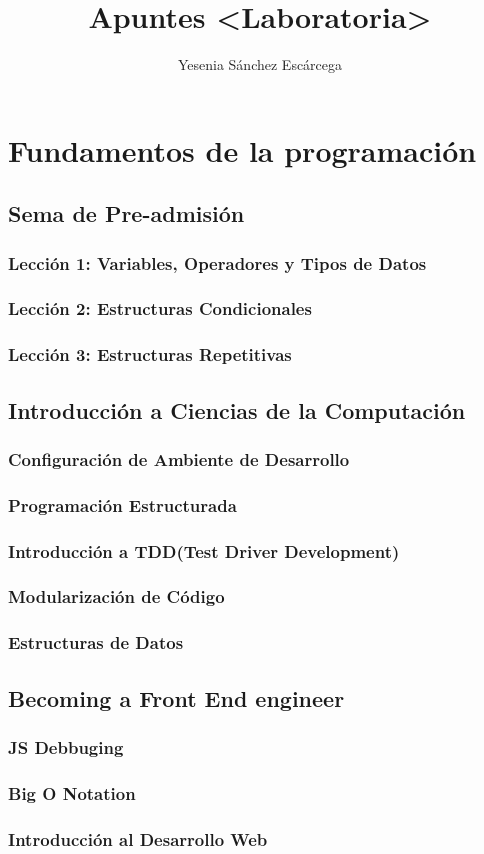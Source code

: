 \documentclass{book}
\title{Apuntes <Laboratoria>}
\author{Yesenia Sánchez Escárcega}
\begin{document}

\maketitle

\part{Fundamentos de la programación}

\chapter{Sema de Pre-admisión}

\section{Lección 1: Variables, Operadores y Tipos de Datos}
\section{Lección 2: Estructuras Condicionales}
\section{Lección 3: Estructuras Repetitivas}

\chapter{Introducción a Ciencias de la Computación}

\section{Configuración de Ambiente de Desarrollo}
\section{Programación Estructurada}
\section{Introducción a TDD(Test Driver Development)}
\section{Modularización de Código}
\section{Estructuras de Datos}

\chapter{Becoming a Front End engineer}
\section{JS Debbuging}
\section{Big O Notation}
\section{Introducción al Desarrollo Web}
\end{document}
